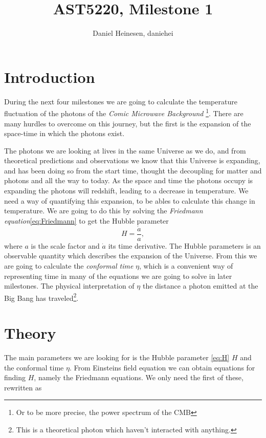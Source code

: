 \documentclass[a4paper,norsk, 10pt]{article}
\title{AST5220, Milestone 1}
\author{Daniel Heinesen, daniehei}
\begin{document}
\maketitle

\section{Introduction}
During the next four milestones we are going to calculate the temperature fluctuation of the photons of the \textit{Comic Microwave Background} \footnote{Or to be more precise, the power spectrum of the CMB}. There are many hurdles to overcome on this journey, but the first is the expansion of the space-time in which the photons exist.

The photons we are looking at lives in the same Universe as we do, and from theoretical predictions and observations we know that this Universe is expanding, and has been doing so from the start time, thought the decoupling for matter and photons and all the way to today. As the space and time the photons occupy is expanding the photons will redshift, leading to a decrease in temperature. 
We need a way of quantifying this expansion, to be ables to calculate this change in temperature. We are going to do this by solving the \textit{Friedmann equation}\eqref{eq:Friedmann} to get the Hubble parameter
\begin{equation}\label{eq:H}
H = \frac{\dot{a}}{a},
\end{equation}
where $a$ is the scale factor and $\dot{a}$ its time derivative. The Hubble parameters is an observable quantity which describes the expansion of the Universe. From this we are going to calculate the \textit{conformal time} $\eta$, which is a convenient way of representing time in many of the equations we are going to solve in later milestones. The physical interpretation of $\eta$ the distance a photon emitted at the Big Bang has traveled\footnote{This is a theoretical photon which haven't interacted with anything.}. 


\section{Theory}


The main parameters we are looking for is the Hubble parameter \eqref{eq:H} $H$ and the conformal time $\eta$. From Einsteins field equation we can obtain equations for finding $H$, namely the Friedmann equations. We only need the first of these, rewritten as
\end{document}
